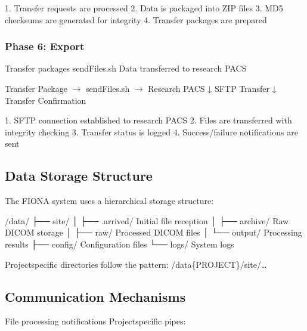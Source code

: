 \documentclass[letterpaper,10pt,english]{sphinxmanual}
\begin{document}
\sphinxAtStartPar
{}
1. Transfer requests are processed
2. Data is packaged into ZIP files
3. MD5 checksums are generated for integrity
4. Transfer packages are prepared


\subsubsection{Phase 6: Export}
\label{\detokenize{Architecture/data-flow:phase-6-export}}
\sphinxAtStartPar
{} Transfer packages
 sendFiles.sh
 Data transferred to research PACS

\begin{sphinxVerbatim}[commandchars=\\\{\}]
Transfer Package \(\rightarrow\) sendFiles.sh \(\rightarrow\) Research PACS
                      ↓
               SFTP Transfer
                      ↓
               Transfer Confirmation
\end{sphinxVerbatim}

\sphinxAtStartPar
{}
1. SFTP connection established to research PACS
2. Files are transferred with integrity checking
3. Transfer status is logged
4. Success/failure notifications are sent


\subsection{Data Storage Structure}
\label{\detokenize{Architecture/data-flow:data-storage-structure}}
\sphinxAtStartPar
The FIONA system uses a hierarchical storage structure:

\begin{sphinxVerbatim}[commandchars=\\\{\}]
/data/
├── site/
│   ├── .arrived/          \PYGZsh{} Initial file reception
│   ├── archive/           \PYGZsh{} Raw DICOM storage
│   ├── raw/              \PYGZsh{} Processed DICOM files
│   └── output/           \PYGZsh{} Processing results
├── config/               \PYGZsh{} Configuration files
└── logs/                 \PYGZsh{} System logs
\end{sphinxVerbatim}

\sphinxAtStartPar
Project\sphinxhyphen{}specific directories follow the pattern:
/data\{PROJECT\}/site/…


\subsection{Communication Mechanisms}
\label{\detokenize{Architecture/data-flow:communication-mechanisms}}
\sphinxAtStartPar
{}
\sphinxhyphen{}  \sphinxhyphen{} File processing notifications
\sphinxhyphen{} Project\sphinxhyphen{}specific pipes: 
\end{document}
